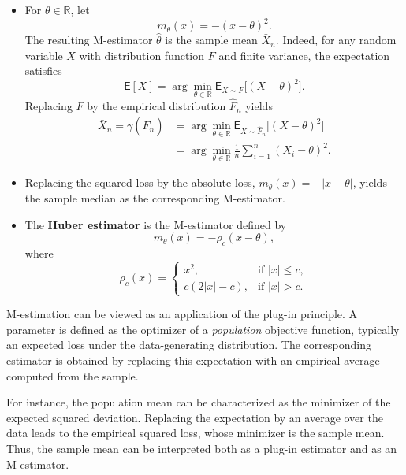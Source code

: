 \begin{ex}
\leavevmode
\begin{itemize}
    \item For \(\theta \in \mathbb{R}\), let
    \[
    m_\theta(x) = - (x - \theta)^2.
    \]
    The resulting M-estimator \(\hat\theta\) is the sample mean \(\bar X_n\).
    Indeed, for any random variable \(X\) with distribution function \(F\)
    and finite variance, the expectation satisfies
    \[
    \mathsf{E}[X]
    = \arg\min_{\theta \in \mathbb{R}}
    \mathsf{E}_{X \sim F}\bigl[(X - \theta)^2\bigr].
    \]
    Replacing \(F\) by the empirical distribution \(\hat F_n\) yields
    \begin{align*}
        \bar X_n
        = \gamma(\hat F_n)
        &= \arg\min_{\theta \in \mathbb{R}}
        \mathsf{E}_{X \sim \hat F_n}\bigl[(X - \theta)^2\bigr] \\
        &= \arg\min_{\theta \in \mathbb{R}}
        \frac{1}{n} \sum_{i=1}^n (X_i - \theta)^2.
    \end{align*}

    \item Replacing the squared loss by the absolute loss,
    \(m_\theta(x) = -|x - \theta|\),
    yields the sample median as the corresponding M-estimator.

    \item The \textbf{Huber estimator} is the M-estimator defined by
    \[
    m_\theta(x) = -\rho_c(x - \theta),
    \]
    where
    \[
    \rho_c(x) =
    \begin{cases}
        x^2, & \text{if } |x| \le c, \\
        c(2|x| - c), & \text{if } |x| > c.
    \end{cases}
    \]
\end{itemize}
\end{ex}

\label{par:connection_plugin}

M-estimation can be viewed as an application of the plug-in principle.
A parameter is defined as the optimizer of a \emph{population} objective
function, typically an expected loss under the data-generating distribution.
The corresponding estimator is obtained by replacing this expectation with an
empirical average computed from the sample.

For instance, the population mean can be characterized as the minimizer of the
expected squared deviation. Replacing the expectation by an average over the
data leads to the empirical squared loss, whose minimizer is the sample mean.
Thus, the sample mean can be interpreted both as a plug-in estimator and as an
M-estimator.

